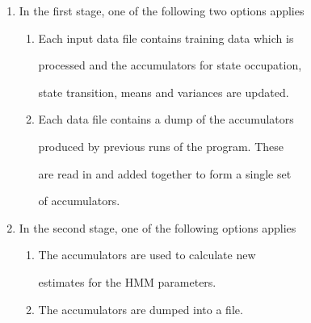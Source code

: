 \begin{enumerate}





\item


    In the first stage, one of the following two options applies


 \begin{enumerate}


  \item        


    Each input data file contains training data which is 


    processed and the accumulators for state occupation, 


    state transition, means and variances are updated.


        


  \item      


    Each data file contains a dump of the accumulators


    produced by previous runs of the program.  These


    are read in and added together to form a single set


    of accumulators.


  \end{enumerate}





\item


   In the second stage, one of the following options applies


  \begin{enumerate}


    \item


         The accumulators are used to calculate new 


         estimates for the HMM parameters.


    \item


         The accumulators are dumped into a file.


  \end{enumerate}


\end{enumerate}





